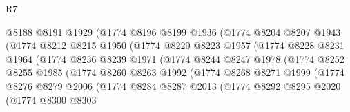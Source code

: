 \begin{lexlean}{R7}
\begin{coremodule}
                          @8188
                          @8191
                          @1929
                          (@1774
                            @8196
                            @8199
                            @1936
                            (@1774
                              @8204
                              @8207
                              @1943
                              (@1774
                                @8212
                                @8215
                                @1950
                                (@1774
                                  @8220
                                  @8223
                                  @1957
                                  (@1774
                                    @8228
                                    @8231
                                    @1964
                                    (@1774
                                      @8236
                                      @8239
                                      @1971
                                      (@1774
                                        @8244
                                        @8247
                                        @1978
                                        (@1774
                                          @8252
                                          @8255
                                          @1985
                                          (@1774
                                            @8260
                                            @8263
                                            @1992
                                            (@1774
                                              @8268
                                              @8271
                                              @1999
                                              (@1774
                                                @8276
                                                @8279
                                                @2006
                                                (@1774
                                                  @8284
                                                  @8287
                                                  @2013
                                                  (@1774
                                                    @8292
                                                    @8295
                                                    @2020
                                                    (@1774
                                                      @8300
                                                      @8303

\end{coremodule}
\end{lexlean}
